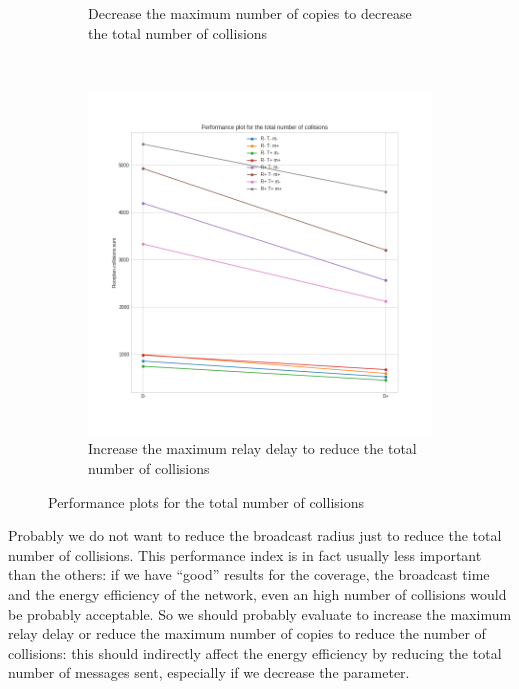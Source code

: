 \begin{figure}[htb]
\begin{subfigure}[b]{0.38\textwidth}
		\caption{Decrease the maximum number of copies to decrease the
		total number of collisions}\label{subfig:hdperfcollisionsm}
	\end{subfigure}\\
	\begin{subfigure}[b]{0.37\textwidth}
		\centering
		\includegraphics[width=\textwidth]{img/hd/collisions-D-perfplot}
		\caption{Increase the maximum relay delay to reduce the total
		number of collisions}\label{subfig:hdperfcollisionsD}
	\end{subfigure}
	\caption{Performance plots for the total number of
	collisions}\label{fig:hdperfcollisions}
\end{figure}

Probably we do not want to reduce the broadcast radius just to reduce the total
number of collisions. This performance index is in fact usually less important
than the others: if we have ``good'' results for the coverage, the broadcast
time and the energy efficiency of the network, even an high number of collisions
would be probably acceptable. So we should probably evaluate to increase the
maximum relay delay or reduce the maximum number of copies to reduce the number
of collisions: this should indirectly affect the energy efficiency by reducing
the total number of messages sent, especially if we decrease the
 parameter.
